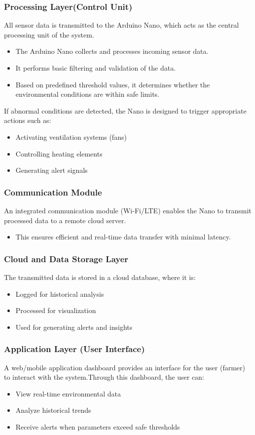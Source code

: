 \documentclass[../main.tex]{subfiles}
\begin{document}
\subsubsection{ Processing Layer(Control Unit)}
All sensor data is transmitted to the  Arduino Nano, which acts as the central processing unit of the system.
\begin{itemize}
    \item The Arduino Nano collects and processes incoming sensor data.
    \item It performs basic filtering and validation of the data.
    \item Based on predefined threshold values, it determines whether the environmental conditions are within safe limits.
\end{itemize}
If abnormal conditions are detected, the Nano is designed to trigger appropriate actions such as:
\begin{itemize}
    \item Activating ventilation systems (fans)
    \item Controlling heating elements
    \item Generating alert signals
\end{itemize}

\subsubsection{ Communication Module}
An integrated communication module (Wi-Fi/LTE) enables the Nano to transmit processed data to a remote cloud server.
\begin{itemize}
    \item This ensures efficient and real-time data transfer with minimal latency.
\end{itemize}

\subsubsection{Cloud and Data Storage Layer}
The transmitted data is stored in a cloud database, where it is:
\begin{itemize}
    \item Logged for historical analysis
    \item Processed for visualization
    \item Used for generating alerts and insights
\end{itemize}

\subsubsection{Application Layer (User Interface)}
A web/mobile application dashboard provides an interface for the user (farmer) to interact with the system.Through this dashboard, the user can:
\begin{itemize}
    \item View real-time environmental data
    \item Analyze historical trends
    \item Receive alerts when parameters exceed safe thresholds
\end{itemize}
\end{document}
